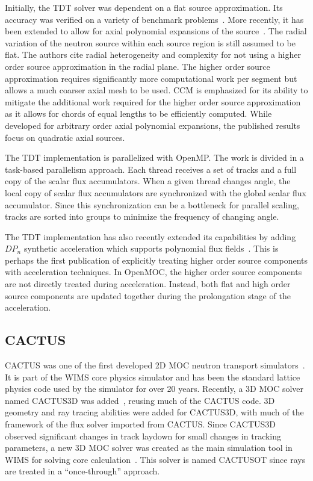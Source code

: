 Initially, the TDT solver was dependent on a flat source approximation. Its accuracy was verified on a variety of benchmark problems~\cite{apollo3_3dmoc, apollo3_vv}. More recently, it has been extended to allow for axial polynomial expansions of the source~\cite{apollo3_extruded}. The radial variation of the neutron source within each source region is still assumed to be flat. The authors cite radial heterogeneity and complexity for not using a higher order source approximation in the radial plane. The higher order source approximation requires significantly more computational work per segment but allows a much coarser axial mesh to be used. \ac{CCM} is emphasized for its ability to mitigate the additional work required for the higher order source approximation as it allows for chords of equal lengths to be efficiently computed. While developed for arbitrary order axial polynomial expansions, the published results focus on quadratic axial sources.

The TDT implementation is parallelized with OpenMP. The work is divided in a task-based parallelism approach. Each thread receives a set of tracks and a full copy of the scalar flux accumulators. When a given thread changes angle, the local copy of scalar flux accumulators are synchronized with the global scalar flux accumulator. Since this synchronization can be a bottleneck for parallel scaling, tracks are sorted into groups to minimize the frequency of changing angle.

The TDT implementation has also recently extended its capabilities by adding $DP_n$ synthetic acceleration which supports polynomial flux fields~\cite{apollo3_exp}. This is perhaps the first publication of explicitly treating higher order source components with acceleration techniques. In OpenMOC, the higher order source components are not directly treated during acceleration. Instead, both flat and high order source components are updated together during the prolongation stage of the acceleration.

\subsection{CACTUS}
\label{sec:cactus}

CACTUS was one of the first developed 2D \ac{MOC} neutron transport simulators~\cite{cactus_2d}. It is part of the WIMS core physics simulator and has been the standard lattice physics code used by the simulator for over 20 years. Recently, a 3D \ac{MOC} solver named CACTUS3D was added~\cite{cactus_3d}, reusing much of the CACTUS code. 3D geometry and ray tracing abilities were added for CACTUS3D, with much of the framework of the flux solver imported from CACTUS. Since CACTUS3D observed significant changes in track laydown for small changes in tracking parameters, a new 3D \ac{MOC} solver was created as the main simulation tool in WIMS for solving core calculation~\cite{cactus_wims}. This solver is named  CACTUSOT since rays are treated in a ``once-through'' approach.

